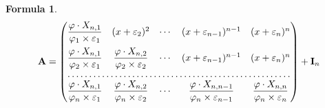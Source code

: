 \documentclass{amsart}
\newtheorem{f}{Formula}
\begin{document}
\begin{f}
\newcommand\ve[1]{\varepsilon\sb{#1}}
\newcommand\vp\varphi
\newcommand\df\dfrac
\newcommand\tim[2]{\vp\sb#1\times\ve{#2}}
\newcommand\xx[1]{\vp\cdot X\sb{n,#1}}
\[
    \mathbf A =
    \begin{pmatrix}
        \df{\xx1}{\tim11} &(x+\ve2)^2
        &\cdots &(x+\ve{n-1})^{n-1} &(x +\ve n)^n
        \\[10pt]
        \df{\xx1}{\tim21} &\df{\xx2}{\tim22}
        &\cdots &(x+\ve{n-1})^{n-1} &(x+\ve n)^n
        \\
        \hdotsfor{5}
        \\
        \df{\xx1}{\tim{n}1} &\df{\xx2}{\tim{n}2}
        &\cdots
        &\df{\xx{n-1}}{\tim{n}{n-1}} &\df{\xx n}{\tim{n}{n}}
    \end{pmatrix}
    + \mathbf I_n
\]
\end{f}
\end{document}
